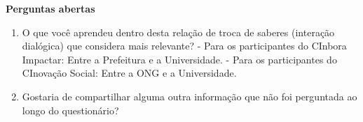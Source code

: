 \par\vspace{1\baselineskip}
\textbf{Perguntas abertas}
\begin{enumerate}
    \item O que você aprendeu dentro desta relação de troca de saberes (interação dialógica) que considera mais relevante?
      - Para os participantes do CInbora Impactar: Entre a Prefeitura e a Universidade.
    - Para os participantes do CInovação Social: Entre a \gls{ONG} e a Universidade.
    \item Gostaria de compartilhar alguma outra informação que não foi perguntada ao longo do questionário?
\end{enumerate}
\par\vspace{1\baselineskip}